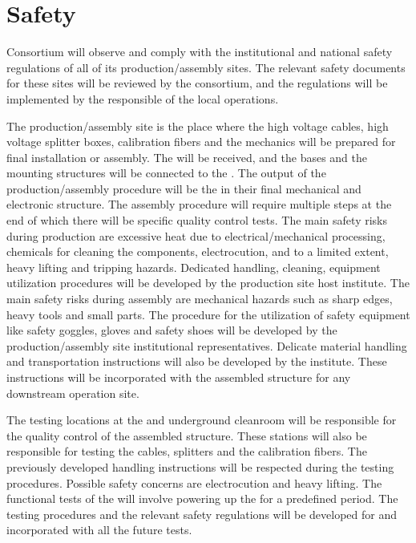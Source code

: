\section{Safety}
\label{sec:dp-pds-safety}

\dual {} Consortium will observe and comply with the institutional and national safety regulations of all of its production/assembly sites. The relevant safety documents for these sites will be reviewed by the consortium, and the regulations will be implemented by the responsible of the local operations.

The production/assembly site is the place where the high voltage cables, high voltage splitter boxes, calibration fibers and the  mechanics will be prepared for final installation or assembly. The  will be received, and the bases and the mounting structures will be connected to the . The output of the production/assembly procedure will be the  in their final mechanical and electronic structure. The assembly procedure will require multiple steps at the end of which there will be specific quality control tests. The main safety risks during production are excessive heat due to electrical/mechanical processing, chemicals for cleaning the components, electrocution, and to a limited extent, heavy lifting and tripping hazards. Dedicated handling, cleaning, equipment utilization procedures will be developed by the production site host institute. The main safety risks during assembly are mechanical hazards such as sharp edges, heavy tools and small parts. The procedure for the utilization of safety equipment like safety goggles, gloves and safety shoes will be developed by the production/assembly site institutional representatives. Delicate material handling and transportation instructions will also be developed by the institute. These instructions will be incorporated with the assembled structure for any downstream operation site.

The testing locations at the  and underground cleanroom  will be responsible for the quality control of the assembled  structure. These stations will also be responsible for testing the  cables,  splitters and the calibration fibers. The previously developed handling instructions will be respected during the testing procedures. Possible safety concerns are electrocution and heavy lifting. The functional tests of the  will involve powering up the  for a predefined period. The testing procedures and the relevant safety regulations will be developed for and incorporated with all the future  tests.

